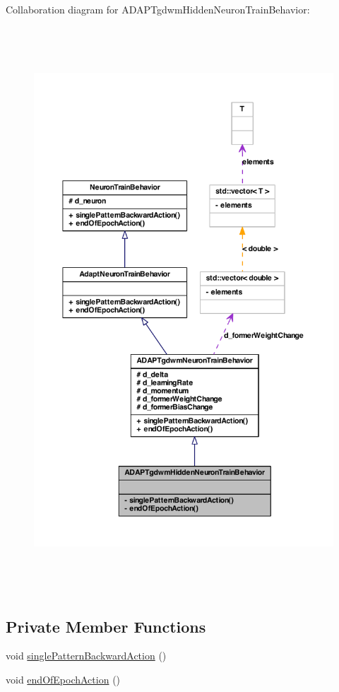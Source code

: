 Collaboration diagram for ADAPTgdwmHiddenNeuronTrainBehavior:
\nopagebreak
\begin{figure}[H]
\begin{center}
\leavevmode
\includegraphics[height=600pt]{class_a_d_a_p_tgdwm_hidden_neuron_train_behavior__coll__graph}
\end{center}
\end{figure}
\subsection*{Private Member Functions}
\begin{DoxyCompactItemize}
\item 
void \hyperlink{class_a_d_a_p_tgdwm_hidden_neuron_train_behavior_aaee129502dae1ddad997f23faf0063b1}{singlePatternBackwardAction} ()
\item 
void \hyperlink{class_a_d_a_p_tgdwm_hidden_neuron_train_behavior_a9d74e4001b26992f7bc8c9fb33e4981a}{endOfEpochAction} ()
\end{DoxyCompactItemize}


